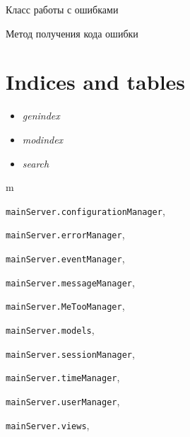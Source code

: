 \documentclass[letterpaper,10pt,english]{sphinxmanual}
\begin{document}
\begin{fulllineitems}
\label{config:mainServer.errorManager.ErrorManager}
Класс работы с ошибками

\begin{fulllineitems}
\label{config:mainServer.errorManager.ErrorManager.getErrorCode}
Метод получения кода ошибки

\end{fulllineitems}


\end{fulllineitems}



\chapter{Indices and tables}
\label{index:indices-and-tables}\begin{itemize}
\item {} 
\emph{genindex}

\item {} 
\emph{modindex}

\item {} 
\emph{search}

\end{itemize}


\renewcommand{\indexname}{Python Module Index}
\begin{theindex}
\def\bigletter#1{{\Large\sffamily#1}\nopagebreak\vspace{1mm}}
\bigletter{m}
\item {\texttt{mainServer.configurationManager}}, \pageref{config:module-mainServer.configurationManager}
\item {\texttt{mainServer.errorManager}}, \pageref{config:module-mainServer.errorManager}
\item {\texttt{mainServer.eventManager}}, \pageref{eventManager:module-mainServer.eventManager}
\item {\texttt{mainServer.messageManager}}, \pageref{messageManager:module-mainServer.messageManager}
\item {\texttt{mainServer.MeTooManager}}, \pageref{MeTooManager:module-mainServer.MeTooManager}
\item {\texttt{mainServer.models}}, \pageref{models:module-mainServer.models}
\item {\texttt{mainServer.sessionManager}}, \pageref{sessionManager:module-mainServer.sessionManager}
\item {\texttt{mainServer.timeManager}}, \pageref{config:module-mainServer.timeManager}
\item {\texttt{mainServer.userManager}}, \pageref{userManager:module-mainServer.userManager}
\item {\texttt{mainServer.views}}, \pageref{view:module-mainServer.views}
\end{theindex}

\renewcommand{\indexname}{Index}
\printindex
\end{document}
